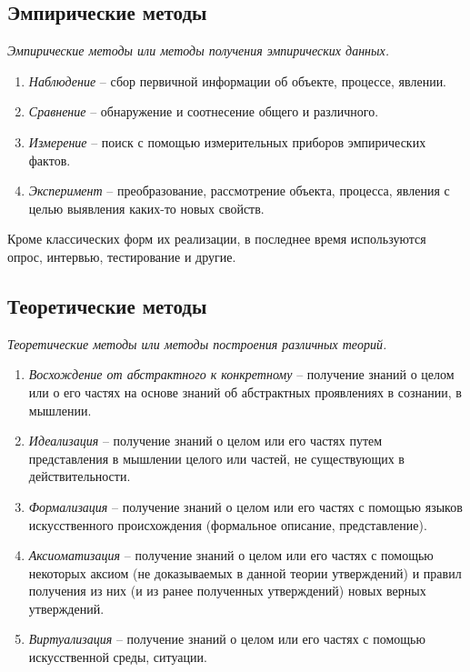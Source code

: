 \subsection{Эмпирические методы}
\emph{Эмпирические методы или методы получения эмпирических данных.}
\begin{enumerate}
\item \emph{Наблюдение} -- сбор первичной информации об объекте, процессе, явлении.
\item \emph{Сравнение} -- обнаружение и соотнесение общего и различного.
\item \emph{Измерение} -- поиск с помощью измерительных приборов эмпирических фактов.
\item \emph{Эксперимент} -- преобразование, рассмотрение объекта, процесса, явления с целью выявления каких-то новых свойств.
\end{enumerate}
Кроме классических форм их реализации, в последнее время используются опрос, интервью, тестирование и другие.
\subsection{Теоретические методы}
\emph{Теоретические методы или методы построения различных теорий.}
\begin{enumerate}
\item \emph{Восхождение от абстрактного к конкретному} -- получение знаний о целом или о его частях на основе знаний об абстрактных проявлениях в сознании, в мышлении.
\item \emph{Идеализация} -- получение знаний о целом или его частях путем представления в мышлении целого или частей, не существующих в действительности.
\item \emph{Формализация} -- получение знаний о целом или его частях с помощью языков искусственного происхождения (формальное описание, представление).
\item \emph{Аксиоматизация} -- получение знаний о целом или его частях с помощью некоторых аксиом (не доказываемых в данной теории утверждений) и правил получения из них (и из ранее полученных утверждений) новых верных утверждений.
\item \emph{Виртуализация} -- получение знаний о целом или его частях с помощью искусственной среды, ситуации.
\end{enumerate}

